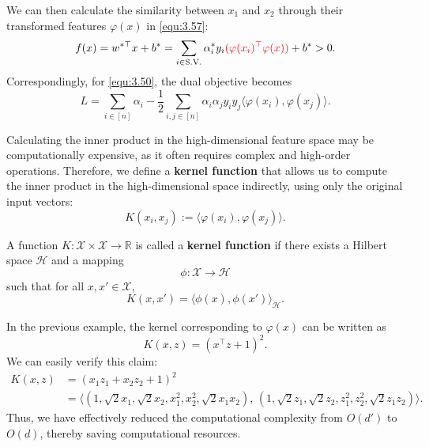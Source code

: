 \documentclass[../main]{subfiles}
\begin{document}
We can then calculate the similarity between $x_1$ and $x_2$ through their transformed features $\varphi(x)$ in \eqref{equ:3.57}:
\begin{equation}
    f(x) = w^{*\top} x + b^*
    = \sum_{i \in \mathrm{S.V.}} \alpha_i^* y_i {\color{red}(\varphi(x_i)^\top \varphi(x))} + b^* > 0.
    \label{equ:3.60}
\end{equation}
Correspondingly, for \eqref{equ:3.50}, the dual objective becomes
\begin{equation}
    L
    = \sum_{i \in [n]} \alpha_i
    - \frac{1}{2}
      \sum_{i,j \in [n]} \alpha_i \alpha_j y_i y_j
      \langle \varphi(x_i), \varphi(x_j) \rangle.
    \label{equ:3.61}
\end{equation}

Calculating the inner product in the high-dimensional feature space may be computationally expensive, as it often requires complex and high-order operations.  
Therefore, we define a \textbf{kernel function} that allows us to compute the inner product in the high-dimensional space indirectly, using only the original input vectors:
\begin{equation}
    K(x_i, x_j) := \langle \varphi(x_i), \varphi(x_j) \rangle.
\end{equation}

\begin{definition}
    A function $K : \mathcal{X} \times \mathcal{X} \to \mathbb{R}$ is called a \textbf{kernel function} if there exists a Hilbert space $\mathcal{H}$ and a mapping 
    \begin{equation}
        \phi : \mathcal{X} \to \mathcal{H}
    \end{equation}
    such that for all $x, x' \in \mathcal{X}$,
    \begin{equation}
        K(x, x') = \langle \phi(x), \phi(x') \rangle_{\mathcal{H}}.
    \end{equation}
    
    \end{definition}

    In the previous example, the kernel corresponding to $\varphi(x)$ can be written as
    \begin{equation}
        K(x, z) = (x^\top z + 1)^2.
    \end{equation}
    We can easily verify this claim:
    \begin{align*}
        K(x, z)
        &= (x_1 z_1 + x_2 z_2 + 1)^2 \\
        &= \langle (1, \sqrt{2}x_1, \sqrt{2}x_2, x_1^2, x_2^2, \sqrt{2}x_1 x_2),\,
                   (1, \sqrt{2}z_1, \sqrt{2}z_2, z_1^2, z_2^2, \sqrt{2}z_1 z_2) \rangle.
    \end{align*}
    Thus, we have effectively reduced the computational complexity from $O(d')$ to $O(d)$, thereby saving computational resources.
    
\end{document}
